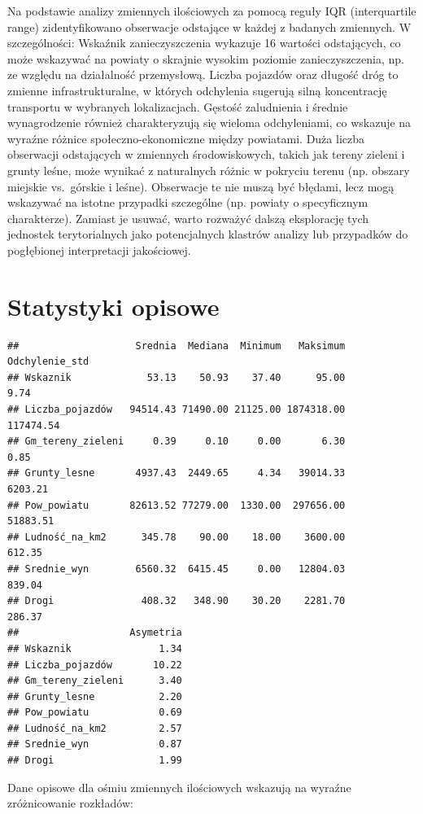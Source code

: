\documentclass[
  11pt,
]{article}
\begin{document}
Na podstawie analizy zmiennych ilościowych za pomocą reguły IQR
(interquartile range) zidentyfikowano obserwacje odstające w każdej z
badanych zmiennych. W szczególności: Wskaźnik zanieczyszczenia wykazuje
16 wartości odstających, co może wskazywać na powiaty o skrajnie wysokim
poziomie zanieczyszczenia, np. ze względu na działalność przemysłową.
Liczba pojazdów oraz długość dróg to zmienne infrastrukturalne, w
których odchylenia sugerują silną koncentrację transportu w wybranych
lokalizacjach. Gęstość zaludnienia i średnie wynagrodzenie również
charakteryzują się wieloma odchyleniami, co wskazuje na wyraźne różnice
społeczno-ekonomiczne między powiatami. Duża liczba obserwacji
odstających w zmiennych środowiskowych, takich jak tereny zieleni i
grunty leśne, może wynikać z naturalnych różnic w pokryciu terenu (np.
obszary miejskie vs.~górskie i leśne). Obserwacje te nie muszą być
błędami, lecz mogą wskazywać na istotne przypadki szczególne (np.
powiaty o specyficznym charakterze). Zamiast je usuwać, warto rozważyć
dalszą eksplorację tych jednostek terytorialnych jako potencjalnych
klastrów analizy lub przypadków do pogłębionej interpretacji
jakościowej.

\section{Statystyki opisowe}\label{statystyki-opisowe}

\begin{verbatim}
##                    Srednia  Mediana  Minimum   Maksimum Odchylenie_std
## Wskaznik             53.13    50.93    37.40      95.00           9.74
## Liczba_pojazdów   94514.43 71490.00 21125.00 1874318.00      117474.54
## Gm_tereny_zieleni     0.39     0.10     0.00       6.30           0.85
## Grunty_lesne       4937.43  2449.65     4.34   39014.33        6203.21
## Pow_powiatu       82613.52 77279.00  1330.00  297656.00       51883.51
## Ludność_na_km2      345.78    90.00    18.00    3600.00         612.35
## Srednie_wyn        6560.32  6415.45     0.00   12804.03         839.04
## Drogi               408.32   348.90    30.20    2281.70         286.37
##                   Asymetria
## Wskaznik               1.34
## Liczba_pojazdów       10.22
## Gm_tereny_zieleni      3.40
## Grunty_lesne           2.20
## Pow_powiatu            0.69
## Ludność_na_km2         2.57
## Srednie_wyn            0.87
## Drogi                  1.99
\end{verbatim}

Dane opisowe dla ośmiu zmiennych ilościowych wskazują na wyraźne
zróżnicowanie rozkładów:
\end{document}
